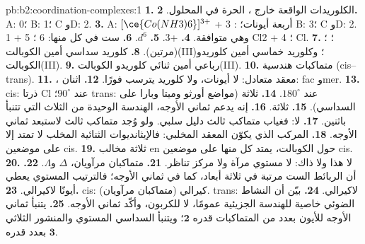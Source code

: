 \begin{solution}{pb:b2:coordination-complexes:1}
\textbf{1.} الكلوريدات الواقعة خارج ، الحرة في المحلول.
\textbf{2.} A: 0؛ B: 1؛ C وD: 2.
\textbf{3.} A: $[\ce{Co(NH3)6}]^{3+}$ + 3 : أربعة أيونات؛ B: 3؛ C وD: 2. وهي متوافقة.
\textbf{4.} +3.
\textbf{5.} $d^6$.
\textbf{6.} ست في كل منها: 6 ؛ 5  + 1 Cl؛ 4  + 2 Cl.
\textbf{7.} ؛ ؛  (مرتين).
\textbf{8.} كلوريد سداسي أمين الكوبالت(III)؛ وكلوريد خماسي أمين كلوريدو الكوبالت(III).
\textbf{9.} رباعي أمين ثنائي كلوريدو الكوبالت(III).
\textbf{10.} متماكبات هندسية (cis--trans).
\textbf{11.} \ce{[CoCl3(NH3)3]}، معقد متعادل: لا أيونات، ولا كلوريد يترسب
فورًا.
\textbf{12.} اثنان: fac وmer.
\textbf{13.} cis: ذرتا Cl عند $90^\circ$؛ trans: عند $180^\circ$.
\textbf{14.} ثلاثة (مواضع أورثو وميتا وبارا على السداسي).
\textbf{15.} ثلاثة.
\textbf{16.} إنه يدعم ثماني الأوجه، الهندسة الوحيدة من الثلاث التي تتنبأ باثنين.
\textbf{17.} لا: فغياب متماكب ثالث دليل سلبي. ولو وُجد متماكب ثالث
لاستبعد ثماني الأوجه.
\textbf{18.} المركب الذي يكوّن المعقد المخلبي: فالإيثانديوات الثنائية المخلب لا تمتد إلا على موضعين
cis.
\textbf{19.} ثلاثة مخالب en حول الكوبالت، يمتد كل منها على موضعين cis.
\textbf{20.} لا هذا ولا ذاك: لا مستوي مرآة ولا مركز تناظر.
\textbf{21.} متماكبان مرآويان، $\Delta$ و$\Lambda$.
\textbf{22.} أن الربائط الست مرتبة في ثلاثة أبعاد، كما في
ثماني الأوجه؛ فالترتيب المستوي يعطي أيونًا لاكيرالي.
\textbf{23.} cis: كيرالي (متماكبان مرآويان). trans: لاكيرالي.
\textbf{24.} بيّن أن النشاط الضوئي خاصية للهندسة الجزيئية عمومًا،
لا للكربون، وأكّد ثماني الأوجه.
\textbf{25.} يتنبأ ثماني الأوجه للأيون \ce{[CoCl2(NH3)4]+} بعدد من المتماكبات قدره $\boldsymbol{2}$؛ ويتنبأ
السداسي المستوي والمنشور الثلاثي بعدد قدره $\boldsymbol{3}$.
\end{solution}
